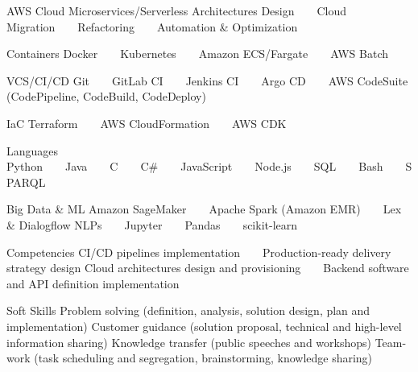 

\begin{cvskills}

\cvskill
{AWS Cloud} %
{Microservices/Serverless Architectures Design~~\textbullet~~Cloud Migration~~\textbullet~~Refactoring~~\textbullet~~Automation \& Optimization} %

\cvskill
{Containers} %
{Docker~~\textbullet~~Kubernetes~~\textbullet~~Amazon ECS/Fargate~~\textbullet~~AWS Batch} %


\cvskill
{VCS/CI/CD}%
{Git~~\textbullet~~GitLab CI~~\textbullet~~Jenkins CI~~\textbullet~~Argo CD~~\textbullet~~AWS CodeSuite (CodePipeline, CodeBuild, CodeDeploy)} %


\cvskill
{IaC} %
{Terraform~~\textbullet~~AWS CloudFormation~~\textbullet~~AWS CDK} %


  \cvskill
    {Languages} %
    {Python~~\textbullet~~Java~~\textbullet~~C~~\textbullet~~C\#~~\textbullet~~JavaScript~~\textbullet~~Node.js~~\textbullet~~SQL~~\textbullet~~Bash~~\textbullet~~SPARQL} %

\cvskill
{Big Data \& ML} %
{Amazon SageMaker~~\textbullet~~Apache Spark (Amazon EMR)~~\textbullet~~Lex \& Dialogflow NLPs~~\textbullet~~Jupyter~~\textbullet~~Pandas~~\textbullet~~scikit-learn} %

  \cvskill
{Competencies} %
{CI/CD pipelines implementation~~\textbullet~~Production-ready delivery strategy design} %
  \cvskill
{} %
{Cloud architectures design and provisioning~~\textbullet~~Backend software and API definition implementation} %
    
    
  \cvskill
{Soft Skills} %
{Problem solving (definition, analysis, solution design, plan and implementation)}
  \cvskill
{} %
  {Customer guidance (solution proposal, technical and high-level information sharing)}
\cvskill
{}
{Knowledge transfer (public speeches and workshops)}
\cvskill
{}
{Team-work (task scheduling and segregation, brainstorming, knowledge sharing)} %

\end{cvskills}

